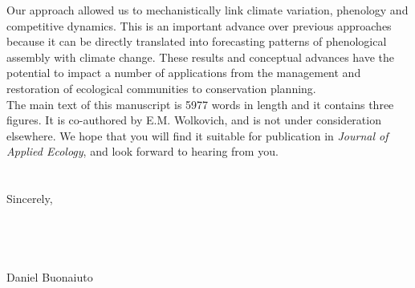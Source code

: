 \documentclass[11.5 pt]{article}
\begin{document}
\noindent Our approach allowed us to mechanistically link climate variation, phenology and competitive dynamics. This is an important advance over previous approaches because it can be directly translated into forecasting patterns of phenological assembly with climate change. These results and conceptual advances have the potential to impact a number of applications from the management and restoration of ecological communities to conservation planning.\\

\noindent The main text of this manuscript is 5977 words in length and it contains three figures. It is co-authored by E.M. Wolkovich, and is not under consideration elsewhere. We hope that you will find it suitable for publication in \textit{Journal of Applied Ecology}, and look forward to hearing from you.\\\\ 
\\Sincerely,\\\\\\\\\\

\noindent Daniel Buonaiuto\\


\end{document}

